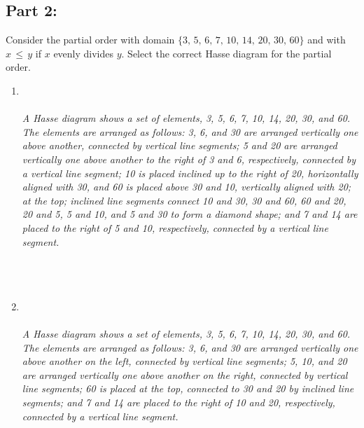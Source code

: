 \documentclass{amsart}
\theoremstyle{definition}
\theoremstyle{Exercise}
\theoremstyle{remark}
\theoremstyle{rule}
\numberwithin{equation}{section}
\begin{document}
\subsection*{Part 2:}
Consider the partial order with domain $\{3,\, 5,\, 6, \,7,\, 10,\, 14,\, 20,\, 30,\,60\}$ and with $x\,\leq \,y$ if $x$ evenly divides $y$. Select the correct Hasse diagram for the partial order.

\begin{enumerate}[label=(\roman*)]
\item
{}
\\\\
{\color{blue}{\bf Figure 2:} \emph{A Hasse diagram shows a set of elements, 3, 5, 6, 7, 10, 14, 20, 30, and 60. The elements are arranged as follows: 3, 6, and 30 are arranged vertically one above another, connected by vertical line segments; 5 and 20 are arranged vertically one above another to the right of 3 and 6, respectively, connected by a vertical line segment; 10 is placed inclined up to the right of 20, horizontally aligned with 30, and 60 is placed above 30 and 10, vertically aligned with 20; at the top; inclined line segments connect 10 and 30, 30 and 60, 60 and 20, 20 and 5, 5 and 10, and 5 and 30 to form a diamond shape; and 7 and 14 are placed to the right of 5 and 10, respectively, connected by a vertical line segment.
}
}
\\
\\
\\\\
\newpage
\item
{}
\\\\
{\color{blue}{\bf Figure 3:} \emph{A Hasse diagram shows a set of elements, 3, 5, 6, 7, 10, 14, 20, 30, and 60. The elements are arranged as follows: 3, 6, and 30 are arranged vertically one above another on the left, connected by vertical line segments; 5, 10, and 20 are arranged vertically one above another on the right, connected by vertical line segments; 60 is placed at the top, connected to 30 and 20 by inclined line segments; and 7 and 14 are placed to the right of 10 and 20, respectively, connected by a vertical line segment.
}
}
\\
\\
\\\\

\end{enumerate}
\end{document}

